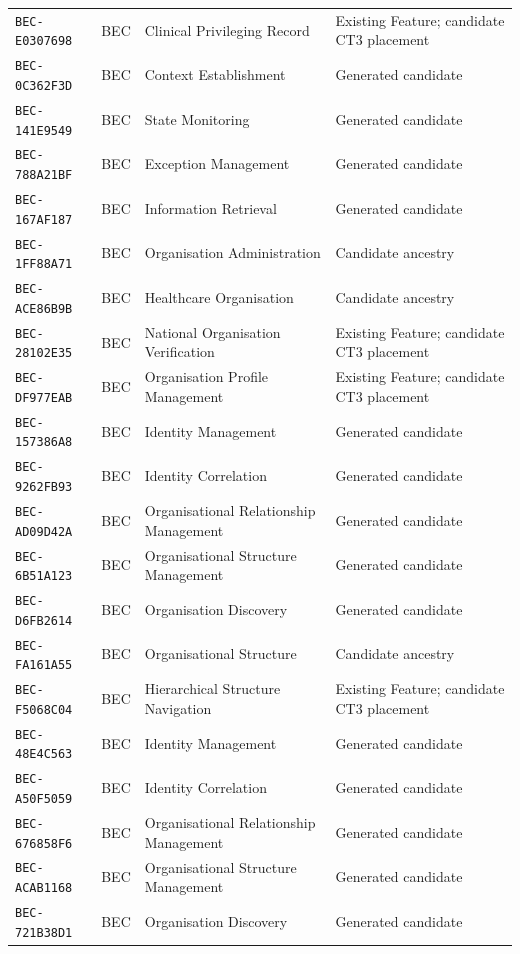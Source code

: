 \documentclass[11pt,a4paper,openany]{book}
\begin{document}
\begin{longtable}{@{}p{.19\linewidth}p{.12\linewidth}p{.39\linewidth}p{.24\linewidth}@{}}
\texttt{BEC-E0307698} & BEC & Clinical Privileging Record & Existing Feature; candidate CT3 placement \\
\texttt{BEC-0C362F3D} & BEC & Context Establishment & Generated candidate \\
\texttt{BEC-141E9549} & BEC & State Monitoring & Generated candidate \\
\texttt{BEC-788A21BF} & BEC & Exception Management & Generated candidate \\
\texttt{BEC-167AF187} & BEC & Information Retrieval & Generated candidate \\
\texttt{BEC-1FF88A71} & BEC & Organisation Administration & Candidate ancestry \\
\texttt{BEC-ACE86B9B} & BEC & Healthcare Organisation & Candidate ancestry \\
\texttt{BEC-28102E35} & BEC & National Organisation Verification & Existing Feature; candidate CT3 placement \\
\texttt{BEC-DF977EAB} & BEC & Organisation Profile Management & Existing Feature; candidate CT3 placement \\
\texttt{BEC-157386A8} & BEC & Identity Management & Generated candidate \\
\texttt{BEC-9262FB93} & BEC & Identity Correlation & Generated candidate \\
\texttt{BEC-AD09D42A} & BEC & Organisational Relationship Management & Generated candidate \\
\texttt{BEC-6B51A123} & BEC & Organisational Structure Management & Generated candidate \\
\texttt{BEC-D6FB2614} & BEC & Organisation Discovery & Generated candidate \\
\texttt{BEC-FA161A55} & BEC & Organisational Structure & Candidate ancestry \\
\texttt{BEC-F5068C04} & BEC & Hierarchical Structure Navigation & Existing Feature; candidate CT3 placement \\
\texttt{BEC-48E4C563} & BEC & Identity Management & Generated candidate \\
\texttt{BEC-A50F5059} & BEC & Identity Correlation & Generated candidate \\
\texttt{BEC-676858F6} & BEC & Organisational Relationship Management & Generated candidate \\
\texttt{BEC-ACAB1168} & BEC & Organisational Structure Management & Generated candidate \\
\texttt{BEC-721B38D1} & BEC & Organisation Discovery & Generated candidate \\

\end{longtable}
\end{document}

